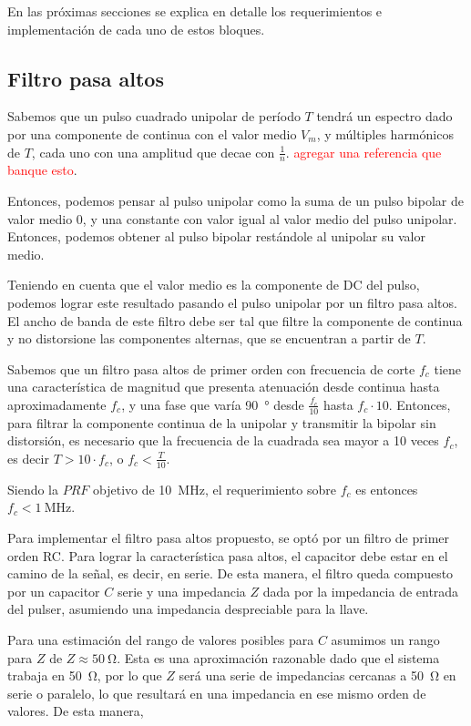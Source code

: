 En las próximas secciones se explica en detalle los requerimientos e
implementación de cada uno de estos bloques.

\subsection{Filtro pasa altos}

Sabemos que un pulso cuadrado unipolar de período $T$ tendrá un espectro dado
por una componente de continua con el valor medio $V_{m}$, y múltiples
harmónicos de $T$, cada uno con una amplitud que decae con $\frac{1}{n}$.
\textcolor{red}{agregar una referencia que banque esto}.

Entonces, podemos pensar al pulso unipolar como la suma de un pulso bipolar de
valor medio 0, y una constante con valor igual al valor medio del pulso
unipolar. Entonces, podemos obtener al pulso bipolar restándole al unipolar su
valor medio.

Teniendo en cuenta que el valor medio es la componente de DC del pulso, podemos
lograr este resultado pasando el pulso unipolar por un filtro pasa altos. El ancho
de banda de este filtro debe ser tal que filtre la componente de continua y no
distorsione las componentes alternas, que se encuentran a partir de $T$.

Sabemos que un filtro pasa altos de primer orden con frecuencia de corte $f_c$
tiene una característica de magnitud que presenta atenuación desde continua hasta
aproximadamente $f_c$, y una fase que varía \qty{90}{\degree} desde
$\frac{f_c}{10}$ hasta $f_c \cdot 10$. Entonces, para filtrar la componente
continua de la unipolar y transmitir la bipolar sin distorsión,
es necesario que la frecuencia de la cuadrada sea mayor a 10 veces $f_c$, es
decir $T > 10 \cdot f_c$, o $f_c < \frac{T}{10}$.

Siendo la $PRF$ objetivo de \qty{10}{\mega\hertz}, el requerimiento sobre $f_c$
es entonces $f_c < \qty{1}{\mega\hertz}$.

Para implementar el filtro pasa altos propuesto, se optó por un filtro de primer
orden RC. Para lograr la característica pasa altos, el capacitor debe estar en
el camino de la señal, es decir, en serie. De esta manera, el filtro queda
compuesto por un capacitor $C$ serie y una impedancia $Z$ dada por la impedancia
de entrada del pulser, asumiendo una impedancia despreciable para la llave.

Para una estimación del rango de valores posibles para $C$ asumimos un rango
para $Z$ de $ Z \approx \qty{50}{\ohm}$. Esta es una aproximación razonable dado
que el sistema trabaja en \qty{50}{\ohm}, por lo que $Z$ será una serie de
impedancias cercanas a \qty{50}{\ohm} en serie o paralelo, lo que resultará en
una impedancia en ese mismo orden de valores. De esta manera,

